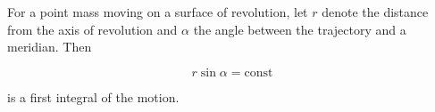 For a point mass moving on a surface of revolution, let $r$ denote the distance from the axis of revolution and $\alpha$ the angle between the trajectory and a meridian. Then

$$r \sin \alpha = \text{const}$$

is a first integral of the motion.
